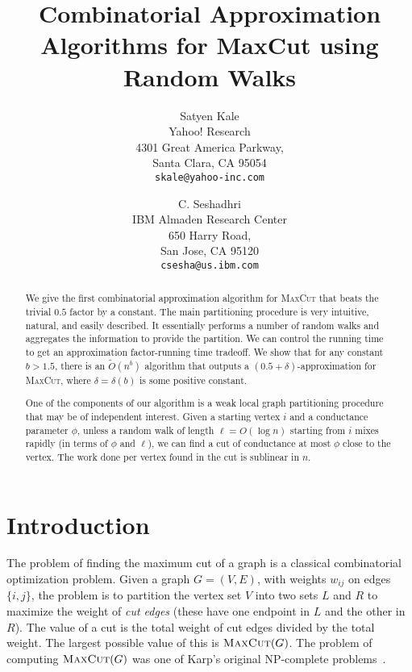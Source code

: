 \documentclass[11pt]{article}
\newcommand\otilde{\widetilde{O}}
\def\maxcut{\textsc{MaxCut}\xspace}
\begin{document}
\begin{titlepage}
\title{Combinatorial Approximation Algorithms for {\sc MaxCut} using Random Walks}
\date{}
\author{
Satyen Kale\\
Yahoo! Research\\
4301 Great America Parkway, \\
Santa Clara, CA 95054\\
{\tt skale@yahoo-inc.com} \and
C. Seshadhri \\
IBM Almaden Research Center\\
650 Harry Road, \\
San Jose, CA 95120\\
{\tt csesha@us.ibm.com}}
\maketitle

\thispagestyle{empty}
\begin{abstract}

We give the first combinatorial approximation algorithm for \maxcut that beats
the trivial $0.5$ factor by a constant. The main partitioning procedure is very intuitive, natural, and easily described. It essentially performs a number of random walks and aggregates the information to provide the partition. We can control the running time to get an approximation factor-running time tradeoff. We show that for any constant $b > 1.5$, there is an $\otilde(n^{b})$ algorithm that outputs a $(0.5+\delta)$-approximation for \maxcut, where $\delta = \delta(b)$ is some positive constant.

One of the components of our algorithm is a weak local
graph partitioning procedure that may be of independent interest. Given a starting vertex $i$ and a conductance parameter $\phi$, unless a random walk of length $\ell = O(\log n)$ starting from $i$ mixes rapidly (in terms of $\phi$ and $\ell$), we can find a cut of conductance at most $\phi$ close to the vertex. The work done per vertex found in the cut is sublinear in $n$.
\end{abstract}
\end{titlepage}


\section{Introduction}

The problem of finding the maximum cut of a graph is a classical combinatorial optimization problem. Given a graph $G = (V, E)$, with weights $w_{ij}$ on edges $\{i, j\}$, the problem is to partition the vertex set $V$ into two sets $L$ and $R$ to maximize the weight of \emph{cut edges} (these have one endpoint in $L$ and the other in $R$). The value of a cut is the total weight of cut edges divided by the total weight. The largest possible value of this is $\maxcut(G)$.
The problem of computing $\maxcut(G)$ was one of Karp's original NP-complete problems~\cite{Kar75}.
\end{document}
